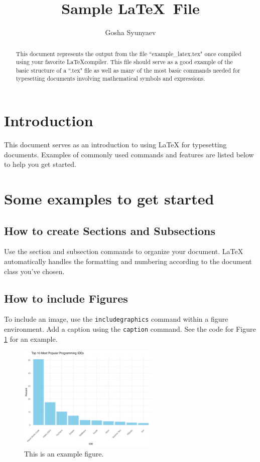 \documentclass[]{article}
\title{Sample \LaTeX ~File}
\author{Gosha Syunyaev}
\begin{document}
\maketitle

\begin{abstract}
  This document represents the output from the file ``example\_latex.tex" once compiled using your favorite \LaTeX compiler.  This file should serve as a good example of the basic structure of a ``.tex" file as well as many of the most basic commands needed for typesetting documents involving mathematical symbols and expressions. 
\end{abstract}

\tableofcontents

\newpage

\section{Introduction}

This document serves as an introduction to using \LaTeX{} for typesetting documents. Examples of commonly used commands and features are listed below to help you get started.

\section{Some examples to get started}

\subsection{How to create Sections and Subsections}

Use the section and subsection commands to organize your document. \LaTeX{} automatically handles the formatting and numbering according to the document class you've chosen.

\subsection{How to include Figures}

To include an image, use the \texttt{includegraphics} command within a figure environment. Add a caption using the \texttt{caption} command. See the code for Figure \ref{fig:frog} for an example.

\FloatBarrier

\begin{figure}[htbp]
\centering
\includegraphics[width=0.6\textwidth]{supp/ide_plot.jpeg}
\caption{\label{fig:frog}This is an example figure.}
\end{figure}
\end{document}
